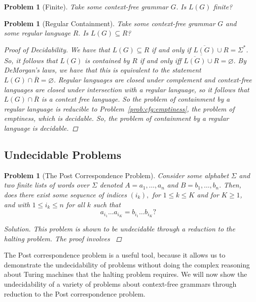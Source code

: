 \documentclass[psamsfonts]{amsart}
\newtheorem{prob}[thm]{Problem}
\theoremstyle{definition}
\theoremstyle{remark}
\numberwithin{equation}{section}
\begin{document}
\begin{prob}[Finite]
Take some context-free grammar $G$. Is $L(G)$ finite?
\end{prob}

\begin{prob}[Regular Containment]
Take some context-free grammar $G$ and some regular language $R$. Is
$L(G)\subseteq R$?
\begin{proof}[Proof of Decidability]
  We have that $L(G)\subseteq R$ if and only if
  $\overline{L(G)}\cup R = \Sigma^*$. So, it follows that $L(G)$ is contained by
  $R$ if and only iff $\overline{\overline{L(G)}\cup R} = \varnothing$. By
  DeMorgan's laws, we have that this is equivalent to the statement
  $L(G)\cap \overline{R} = \varnothing$. Regular languages are closed under
  complement and context-free languages are closed under intersection with a
  regular language, so it follows that $L(G)\cap \overline{R}$ is a context free
  language. So the problem of containment by a regular language is reducible to
  Problem~\ref{prob:cfg:emptiness}, the problem of emptiness, which is
  decidable. So, the problem of containment by a regular language is decidable.
\end{proof}

\end{prob}

\subsection{Undecidable Problems}
\begin{prob}[The Post Correspondence Problem]
  Consider some alphabet $\Sigma$ and two finite lists of words over $\Sigma$
  denoted $A = a_1,\dots,a_n$ and $B = b_1, \dots, b_n$. Then, does there exist
some sequence of indices $(i_k),$ for $1 \leq k \leq K$ and for
  $K\geq 1$, and with $1 \leq i_k \leq n$ for all $k$ such that
  \[
    a_{i_1}\dots a_{i_K} = b_{i_1}\dots b_{i_K}?
  \]
  \begin{proof}[Solution]
    This problem is shown to be undecidable through a reduction to the halting
    problem. The proof involves 
    \cite{sipser13:_introd_theor_comput}
  \end{proof}
\end{prob}

The Post correspondence problem is a useful tool, because it allows us to
demonstrate the undecidability of problems without doing the complex reasoning
about Turing machines that the halting problem requires. We will now show the
undecidability of a variety of problems about context-free grammars through
reduction to the Post correspondence problem.
\end{document}

